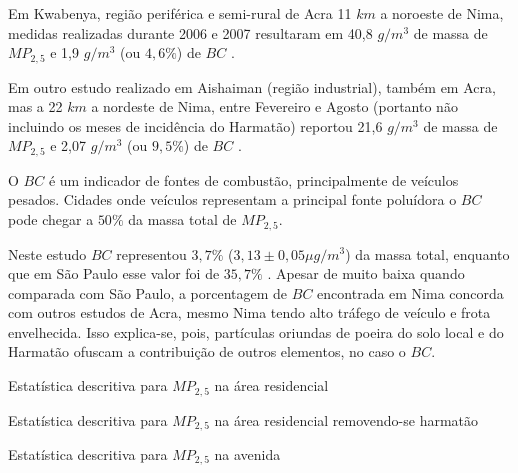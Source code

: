 Em Kwabenya, região periférica e semi-rural de Acra 11 $km$ a noroeste de Nima, 
medidas realizadas durante 2006 e 2007 resultaram em 40,8 $g / m^3$ de massa de 
$MP_{2,5}$ e 1,9 $g / m^3$ (ou $4,6\%$) de $BC$ \citep{aboh2009}.

Em outro estudo realizado em Aishaiman (região industrial), também em Acra, 
mas a 22 $km$ a nordeste de Nima, entre Fevereiro e Agosto (portanto não 
incluindo os meses de incidência do Harmatão) reportou 21,6 $g / m^3$ de massa 
de $MP_{2,5}$ e 2,07 $g / m^3$ (ou $9,5\%$) de $BC$ \citep{ofosu2012}.

O $BC$ é um indicador de fontes de combustão, principalmente de veículos pesados.
Cidades onde veículos representam a principal fonte poluídora o $BC$ pode chegar 
a $50\%$ da massa total de $MP_{2,5}$.  

Neste estudo $BC$ representou $3,7 \%$ ($3,13\pm 0,05 \mu g / m^3$) da massa 
total, enquanto que em São Paulo esse valor foi de $35,7 \%$ \citep{andrade2012}.
Apesar de muito baixa quando comparada com São Paulo, a porcentagem de $BC$ 
encontrada em Nima concorda com outros estudos de Acra, mesmo Nima tendo alto
tráfego de veículo e frota envelhecida. Isso explica-se, pois, partículas 
oriundas de poeira do solo local e do Harmatão ofuscam a contribuição de outros
elementos, no caso o $BC$. 

\begin{table}[H]
  \centering
    
  \caption{Estatística descritiva para $MP_{2,5}$ na área residencial
            \label{table:RFcH_descriptive}}
\end{table}

\begin{table}[H]
  \centering
    
  \caption{Estatística descritiva para $MP_{2,5}$ na área residencial
           removendo-se harmatão \label{table:RFsH_descriptive}}
\end{table}

\begin{table}[H]
  \centering
    
  \caption{Estatística descritiva para $MP_{2,5}$ na avenida
            \label{table:TFcH_descriptive}}
\end{table}

